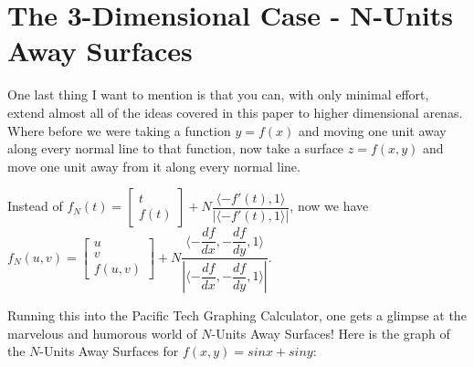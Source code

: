 \section{The 3-Dimensional Case - N-Units Away Surfaces}

One last thing I want to mention is that you can, with only minimal effort, extend almost all of the ideas covered in this paper to higher dimensional arenas. Where before we were taking a function $y = f(x)$ and moving one unit away along every normal line to that function, now take a surface $z = f(x,y)$ and move one unit away from it along every normal line.

Instead of $f_N(t) = \begin{bmatrix} t \\ f(t) \end{bmatrix} + N \dfrac{\langle -f'(t), 1 \rangle}{|\langle -f'(t), 1 \rangle|}$, now we have $f_N(u, v) = \begin{bmatrix} u \\ v \\ f(u, v) \end{bmatrix} + N \dfrac{\langle -\dfrac{df}{dx}, -\dfrac{df}{dy}, 1 \rangle}{|\langle -\dfrac{df}{dx}, -\dfrac{df}{dy}, 1 \rangle|}$.

Running this into the Pacific Tech Graphing Calculator, one gets a glimpse at the marvelous and humorous world of $N$-Units Away Surfaces! Here is the graph of the $N$-Units Away Surfaces for $f(x,y) = sinx + siny$:

